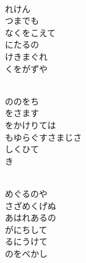 \documentclass[10pt,b5j]{tarticle} %
\begin{document}
\vspace{1.5em} %
\newcommand{\linespace}{0.5em} %
\newcommand{\blocksize}{0.5\hsize} %
\newcommand{\itemmargin}{3em} %
\begin{enumerate} %
    \setlength{\itemindent}{\itemmargin} %
    \begin{minipage}[c]{\blocksize}
    
        \vspace{\linespace}
        \item~\\
        れけん\\
        つまでも\\
        なくをこえて\\
        にたるの\\
        けきまぐれ\\
        くをがずや
        
    \end{minipage}
    \begin{minipage}[c]{\blocksize}
        
        \vspace{\linespace}
        \item~\\
        ののをち\\
        をさます\\
        をかけりては\\
        もゆらぐすさまじさ\\
        しくひて\\
        き
        
    \end{minipage}
    \begin{minipage}[c]{\blocksize}
        
        \vspace{\linespace}
        \item~\\
        めぐるのや\\
        さざめくげぬ\\
        あはれあるの\\
        がにちして\\
        るにうけて\\
        のをべかし
        

\end{minipage}
\end{enumerate}
\end{document}
